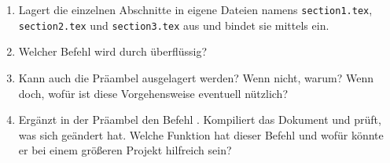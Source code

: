\begin{enumerate}
  \item Lagert die einzelnen Abschnitte in eigene Dateien namens \texttt{section1.tex}, \texttt{section2.tex} und \texttt{section3.tex} aus und bindet sie mittels \texttt{} ein.
  \item Welcher Befehl wird durch \texttt{} überflüssig?
  \item Kann auch die Präambel ausgelagert werden? Wenn nicht, warum? Wenn doch, wofür ist diese Vorgehensweise eventuell nützlich?
  \item Ergänzt in der Präambel den Befehl \texttt{}. Kompiliert das Dokument und prüft, was sich geändert hat. Welche Funktion hat dieser Befehl und wofür könnte er bei einem größeren Projekt hilfreich sein? 
\end{enumerate}
